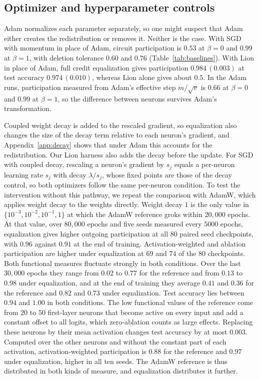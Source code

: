 \documentclass{article} %
\begin{document}
\subsection{Optimizer and hyperparameter controls}
\label{app:baselines}
Adam normalizes each parameter separately, so one might suspect that Adam either creates the redistribution or removes it. Neither is the case. With SGD with momentum in place of Adam, circuit participation is $0.53$ at $\beta = 0$ and $0.99$ at $\beta = 1$, with deletion tolerance $0.60$ and $0.76$ (Table~\ref{tab:baselines}). With Lion in place of Adam, full credit equalization gives participation $0.984\,(0.003)$ at test accuracy $0.974\,(0.010)$, whereas Lion alone gives about $0.5$. In the Adam runs, participation measured from Adam's effective step $m/\sqrt{v}$ is $0.66$ at $\beta = 0$ and $0.99$ at $\beta = 1$, so the difference between neurons survives Adam's transformation.

Coupled weight decay is added to the rescaled gradient, so equalization also changes the size of the decay term relative to each neuron's gradient, and Appendix~\ref{app:decay} shows that under Adam this accounts for the redistribution. Our Lion harness also adds the decay before the update. For SGD with coupled decay, rescaling a neuron's gradient by $s_j$ equals a per-neuron learning rate $s_j$ with decay $\lambda/s_j$, whose fixed points are those of the decay control, so both optimizers follow the same per-neuron condition. To test the intervention without this pathway, we repeat the comparison with AdamW, which applies weight decay to the weights directly. Weight decay $1$ is the only value in $\{10^{-3}, 10^{-2}, 10^{-1}, 1\}$ at which the AdamW reference groks within $20{,}000$ epochs. At that value, over $80{,}000$ epochs and five seeds measured every $5000$ epochs, equalization gives higher outgoing participation at all $80$ paired seed checkpoints, with $0.96$ against $0.91$ at the end of training. Activation-weighted and ablation participation are higher under equalization at $69$ and $74$ of the $80$ checkpoints. Both functional measures fluctuate strongly in both conditions. Over the last $30{,}000$ epochs they range from $0.02$ to $0.77$ for the reference and from $0.13$ to $0.98$ under equalization, and at the end of training they average $0.41$ and $0.36$ for the reference and $0.82$ and $0.73$ under equalization. Test accuracy lies between $0.94$ and $1.00$ in both conditions. The low functional values of the reference come from $20$ to $50$ first-layer neurons that become active on every input and add a constant offset to all logits, which zero-ablation counts as large effects. Replacing these neurons by their mean activation changes test accuracy by at most $0.003$. Computed over the other neurons and without the constant part of each activation, activation-weighted participation is $0.88$ for the reference and $0.97$ under equalization, higher in all ten seeds. The AdamW reference is thus distributed in both kinds of measure, and equalization distributes it further.
\end{document}
